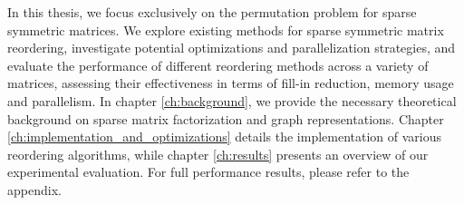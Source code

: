 In this thesis, we focus exclusively on the permutation problem for sparse symmetric matrices. We explore existing methods for sparse symmetric matrix reordering, investigate potential optimizations and parallelization strategies, and evaluate the performance of different reordering methods across a variety of matrices, assessing their effectiveness in terms of fill-in reduction, memory usage and parallelism. In chapter \ref{ch:background}, we provide the necessary theoretical background on sparse matrix factorization and graph representations. Chapter \ref{ch:implementation_and_optimizations} details the implementation of various reordering algorithms, while chapter \ref{ch:results} presents an overview of our experimental evaluation. For full performance results, please refer to the appendix. 







